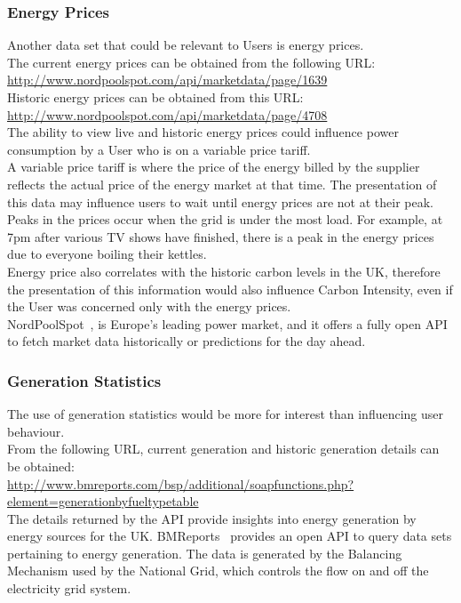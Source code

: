 \documentclass[preprint,12pt,3p]{elsarticle}
\begin{document}
\subsubsection{Energy Prices}
Another data set that could be relevant to Users is energy prices.\\
The current energy prices can be obtained from the following URL:\\[5pt]
 \url{http://www.nordpoolspot.com/api/marketdata/page/1639}\\[5pt]
Historic energy prices can be obtained from this URL:\\[5pt]
 \url{http://www.nordpoolspot.com/api/marketdata/page/4708}\\[5pt]
The ability to view live and historic energy prices could influence power consumption by a User who is on a variable price tariff.\\
A variable price tariff is where the price of the energy billed by the supplier reflects the actual price of the energy market at that time. The presentation of this data may influence users to wait until energy prices are not at their peak.\\
Peaks in the prices occur when the grid is under the most load. For example, at 7pm after various TV shows have finished, there is a peak in the energy prices due to everyone boiling their kettles.\\
Energy price also correlates with the historic carbon levels in the UK, therefore the presentation of this information would also influence Carbon Intensity, even if the User was concerned only with the energy prices.\\
NordPoolSpot~\cite{nordpoolspot}, is Europe's leading power market, and it offers a fully open API to fetch market data historically or predictions for the day ahead.

\subsubsection{Generation Statistics}
The use of generation statistics would be more for interest than influencing user behaviour.\\
From the following URL, current generation and historic generation details can be obtained:\\[5pt]
 \url{http://www.bmreports.com/bsp/additional/soapfunctions.php?element=generationbyfueltypetable}\\[5pt]
The details returned by the API provide insights into energy generation by energy sources for the UK.
BMReports~\cite{bmreports} provides an open API to query data sets pertaining to energy generation. The data is generated by the Balancing Mechanism used by the National Grid, which controls the flow on and off the electricity grid system.
 
\end{document}
